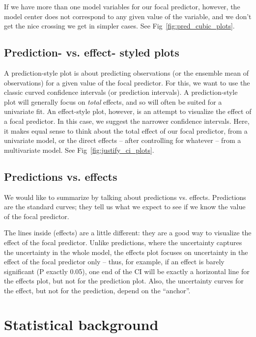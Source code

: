 \documentclass[10pt,letterpaper]{article}
\begin{document}
If we have more than one model variables for our focal predictor, however, the model center does not correspond to any given value of the variable, and we don't get the nice crossing we get in simpler cases. See Fig~\ref{fig:pred_cubic_plots}.


\subsection*{Prediction- vs. effect- styled plots}

A prediction-style plot is about predicting observations (or the ensemble mean of observations) for a given value of the focal predictor. For this, we want to use the classic curved confidence intervals (or prediction intervals). A prediction-style plot will generally focus on \emph{total} effects, and so will often be suited for a univariate fit. An effect-style plot, however, is an attempt to visualize the effect of a focal predictor. In this case, we suggest the narrower confidence intervals. Here, it makes equal sense to think about the total effect of our focal predictor, from a univariate model, or the direct effects – after controlling for whatever – from a multivariate model. See Fig~\ref{fig:justify_ci_plots}.

\subsection*{Predictions vs. effects}

We would like to summarize by talking about predictions vs. effects. Predictions are the standard curves; they tell us what we expect to see if we know the value of the focal predictor.

The lines inside (effects) are a little different: they are a good way to visualize the effect of the focal predictor. Unlike predictions, where the uncertainty captures the uncertainty in the whole model, the effects plot focuses on uncertainty in the effect of the focal predictor only -- thus, for example, if an effect is barely significant (P exactly 0.05), one end of the CI will be exactly a horizontal line for the effects plot, but not for the prediction plot. Also, the uncertainty curves for the effect, but not for the prediction, depend on the ``anchor''.



\section*{Statistical background}
\end{document}
